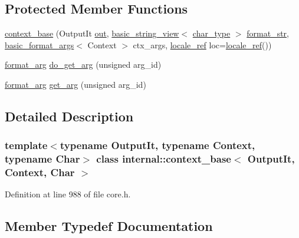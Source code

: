 \subsection*{Protected Member Functions}
\begin{DoxyCompactItemize}
\item 
\hyperlink{classinternal_1_1context__base_adf802ddfa4af4dcc110b82fa298f9e59}{context\+\_\+base} (Output\+It \hyperlink{classinternal_1_1context__base_ab77c1d5e2cf72ef323e1599be8567fee}{out}, \hyperlink{classbasic__string__view}{basic\+\_\+string\+\_\+view}$<$ \hyperlink{classinternal_1_1context__base_a012818dce2cbba8d267491288b9f3f63}{char\+\_\+type} $>$ \hyperlink{format_8h_aa2b402011ee0619f2158f13e0827e585}{format\+\_\+str}, \hyperlink{classbasic__format__args}{basic\+\_\+format\+\_\+args}$<$ Context $>$ ctx\+\_\+args, \hyperlink{classinternal_1_1locale__ref}{locale\+\_\+ref} loc=\hyperlink{classinternal_1_1locale__ref}{locale\+\_\+ref}())
\item 
\hyperlink{classinternal_1_1context__base_aa0c806d3176db7f4c5e5a0fa08561102}{format\+\_\+arg} \hyperlink{classinternal_1_1context__base_aba7fbe1704fbe9409fce1aa51e75e0f1}{do\+\_\+get\+\_\+arg} (unsigned arg\+\_\+id)
\item 
\hyperlink{classinternal_1_1context__base_aa0c806d3176db7f4c5e5a0fa08561102}{format\+\_\+arg} \hyperlink{classinternal_1_1context__base_acf1edcc7f389838d65ea8261d4c267e6}{get\+\_\+arg} (unsigned arg\+\_\+id)
\end{DoxyCompactItemize}


\subsection{Detailed Description}
\subsubsection*{template$<$typename Output\+It, typename Context, typename Char$>$\newline
class internal\+::context\+\_\+base$<$ Output\+It, Context, Char $>$}



Definition at line 988 of file core.\+h.



\subsection{Member Typedef Documentation}
\mbox{\label{classinternal_1_1context__base_a012818dce2cbba8d267491288b9f3f63}} 
